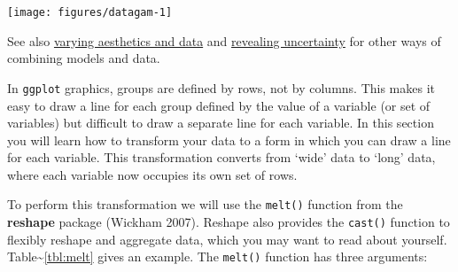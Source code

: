\begin{Shaded}
\begin{Highlighting}[]
\NormalTok{>}\StringTok{ }\StringTok{ }\StringTok{ } \NormalTok{) +}\StringTok{ } 
\NormalTok{>}\StringTok{ }\StringTok{ }\NormalTok{(}
\NormalTok{+}\StringTok{   } \NormalTok{(}\NormalTok{, }\NormalTok{, } \NormalTok{),}
\NormalTok{+}\StringTok{   } 
\NormalTok{+}\StringTok{ }\NormalTok{))}
\NormalTok{>}\StringTok{ }\StringTok{ }
\NormalTok{>}\StringTok{ }   \NormalTok{)}
\end{Highlighting}
\end{Shaded}

\texttt{[image: figures/datagam-1]}

See also \hyperref[sub:different-aesthetics]{varying aesthetics and
data} and \hyperref[sec:uncertainty]{revealing uncertainty} for other
ways of combining models and data.


In \texttt{ggplot} graphics, groups are defined by rows, not by columns.
This makes it easy to draw a line for each group defined by the value of
a variable (or set of variables) but difficult to draw a separate line
for each variable. In this section you will learn how to transform your
data to a form in which you can draw a line for each variable. This
transformation converts from `wide' data to `long' data, where each
variable now occupies its own set of rows. 

To perform this transformation we will use the \texttt{melt()} function
from the \textbf{reshape} package (Wickham 2007). Reshape also provides
the \texttt{cast()} function to flexibly reshape and aggregate data,
which you may want to read about yourself.
Table\textasciitilde{}\ref{tbl:melt} gives an example. The
\texttt{melt()} function has three arguments: 

